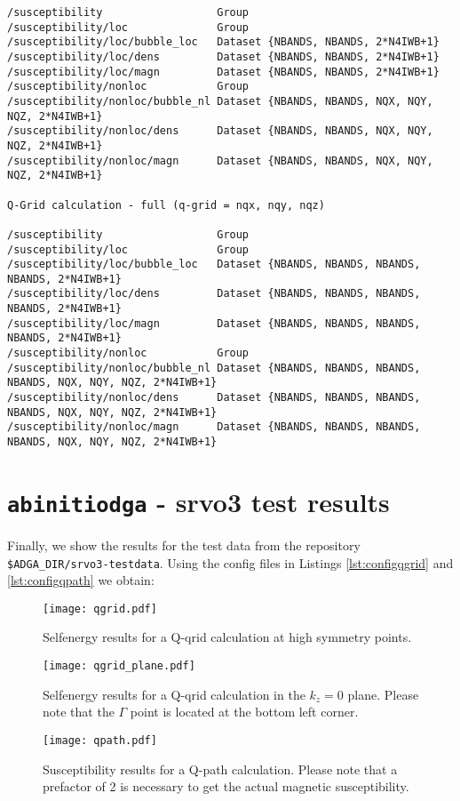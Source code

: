 \documentclass[a4paper,11pt]{article}
\numberwithin{equation}{section} %
\begin{document}
\begin{lstlisting}[caption=susceptibility output comparison, frame=single, basicstyle=\scriptsize]
/susceptibility                  Group
/susceptibility/loc              Group
/susceptibility/loc/bubble_loc   Dataset {NBANDS, NBANDS, 2*N4IWB+1}
/susceptibility/loc/dens         Dataset {NBANDS, NBANDS, 2*N4IWB+1}
/susceptibility/loc/magn         Dataset {NBANDS, NBANDS, 2*N4IWB+1}
/susceptibility/nonloc           Group
/susceptibility/nonloc/bubble_nl Dataset {NBANDS, NBANDS, NQX, NQY, NQZ, 2*N4IWB+1}
/susceptibility/nonloc/dens      Dataset {NBANDS, NBANDS, NQX, NQY, NQZ, 2*N4IWB+1}
/susceptibility/nonloc/magn      Dataset {NBANDS, NBANDS, NQX, NQY, NQZ, 2*N4IWB+1}

Q-Grid calculation - full (q-grid = nqx, nqy, nqz)

/susceptibility                  Group
/susceptibility/loc              Group
/susceptibility/loc/bubble_loc   Dataset {NBANDS, NBANDS, NBANDS, NBANDS, 2*N4IWB+1}
/susceptibility/loc/dens         Dataset {NBANDS, NBANDS, NBANDS, NBANDS, 2*N4IWB+1}
/susceptibility/loc/magn         Dataset {NBANDS, NBANDS, NBANDS, NBANDS, 2*N4IWB+1}
/susceptibility/nonloc           Group
/susceptibility/nonloc/bubble_nl Dataset {NBANDS, NBANDS, NBANDS, NBANDS, NQX, NQY, NQZ, 2*N4IWB+1}
/susceptibility/nonloc/dens      Dataset {NBANDS, NBANDS, NBANDS, NBANDS, NQX, NQY, NQZ, 2*N4IWB+1}
/susceptibility/nonloc/magn      Dataset {NBANDS, NBANDS, NBANDS, NBANDS, NQX, NQY, NQZ, 2*N4IWB+1}

\end{lstlisting}

\newpage
\section{\protect\Verb+abinitiodga+ - srvo3 test results}

Finally, we show the results for the test data from the repository \verb+$ADGA_DIR/srvo3-testdata+.
Using the config files in Listings \ref{lst:configqgrid} and \ref{lst:configqpath} we obtain:

\begin{figure}[H]
\begin{center}
\texttt{[image: qgrid.pdf]}
\caption{Selfenergy results for a Q-qrid calculation at high symmetry points.}
\end{center}
\end{figure}

\begin{figure}[H]
\begin{center}
\texttt{[image: qgrid\_plane.pdf]}
\caption{Selfenergy results for a Q-qrid calculation in the $k_z=0$ plane. Please note that the $\Gamma$ point is located at the bottom left corner.}
\end{center}
\end{figure}

\newpage

\begin{figure}[H]
\begin{center}
\texttt{[image: qpath.pdf]}
\caption{Susceptibility results for a Q-path calculation. Please note that a prefactor of 2 is necessary to get the actual magnetic susceptibility.}
\end{center}
\end{figure}
\end{document}
